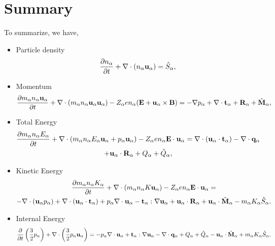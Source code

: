 \documentclass[a4paper,11pt]{report}
\begin{document}
\section{Summary}
To summarize, we have,
\begin{itemize}
    \item Particle density
\begin{equation}
\label{eq:cons_mass}
    \frac{\partial n_\alpha}{\partial t} + \nabla \cdot \left ( n_\alpha \mathbf{u}_\alpha \right ) = \hat{S}_\alpha,
\end{equation}

    \item Momentum
\begin{equation}
\label{eq:cons_mom}
    \frac{\partial m_\alpha n_\alpha \mathbf{u}_\alpha}{\partial t} + \nabla \cdot \left ( m_\alpha n_\alpha \mathbf{u}_\alpha \mathbf{u}_\alpha \right) - Z_\alpha e n_\alpha ( \mathbf{E} + \mathbf{u}_\alpha \times \mathbf{B} ) = - \nabla p_\alpha + \nabla \cdot \mathbf{t}_\alpha + \mathbf{R}_\alpha + \hat{\mathbf{M}}_\alpha,
\end{equation}

    \item Total Energy
\begin{multline}
\label{eq:cons_te}
\frac{\partial m_\alpha n_\alpha E_\alpha}{\partial t} + \nabla \cdot (m_\alpha n_\alpha E_\alpha \mathbf{u}_\alpha + p_\alpha \mathbf{u}_\alpha ) - Z_\alpha e n_\alpha \mathbf{E} \cdot \mathbf{u}_\alpha = \nabla \cdot ( \mathbf{u}_\alpha \cdot \mathbf{t}_\alpha ) - \nabla \cdot \mathbf{q}_\alpha \\
+ \mathbf{u}_\alpha \cdot \mathbf{R}_\alpha + Q_{\alpha} + \hat{Q}_\alpha, 
\end{multline}
    
    \item Kinetic Energy
\begin{multline}
\label{eq:cons_ke}
\frac{\partial m_\alpha n_\alpha K_\alpha}{\partial t} + \nabla \cdot ( m_\alpha n_\alpha K \mathbf{u}_\alpha ) - Z_\alpha e n_\alpha \mathbf{E} \cdot \mathbf{u}_\alpha =\\
-\nabla \cdot ( \mathbf{u}_\alpha p_\alpha ) + \nabla \cdot (\mathbf{u}_\alpha \cdot \mathbf{t}_\alpha ) + p_\alpha \nabla \cdot \mathbf{u}_\alpha - \mathbf{t}_\alpha : \nabla \mathbf{u}_\alpha + \mathbf{u}_\alpha \cdot \mathbf{R}_\alpha + \mathbf{u}_\alpha \cdot \hat{\mathbf{M}}_\alpha - m_\alpha K_\alpha \hat{S}_\alpha .
\end{multline}    
    
    \item Internal Energy
\begin{equation}
\label{eq:cons_ie}
    \frac{\partial}{\partial t} \left ( \frac{3}{2} p_\alpha \right ) + \nabla \cdot \left ( \frac{3}{2} p_\alpha \mathbf{u}_\alpha \right ) = -p_\alpha \nabla \cdot \mathbf{u}_\alpha + \mathbf{t}_\alpha : \nabla \mathbf{u}_\alpha - \nabla \cdot \mathbf{q}_\alpha + Q_{\alpha} + \hat{Q}_\alpha - \mathbf{u}_\alpha \cdot \hat{\mathbf{M}}_\alpha + m_\alpha K_\alpha \hat{S}_\alpha .  
\end{equation}

\end{itemize}
\end{document}
